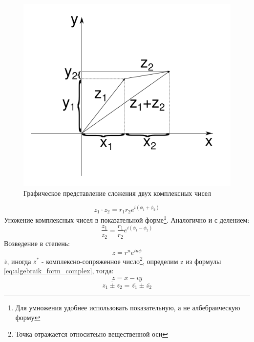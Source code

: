 \documentclass{article}
\begin{document}
            \begin{figure}[h]
                \includegraphics[width=0.8\linewidth]{adding_example}
                \caption{Графическое представление сложения двух комплексных чисел}
                \label{ris:adding_example}
            \end{figure}
            \begin{equation}
               z_{1} \cdot z_{2}=r_{1} r_{2} e^{i (\phi_{1} + \phi_{2})}              
            \end{equation}
            Уножение комплексных чисел в показательной форме\footnote{Для умножения удобнее использовать показательную, а не албебраическую форму}. Аналогично и с делением:
            \begin{equation}
               \frac{z_{1}}{z_{2}}=\frac{r_{1}}{r_{2}} e^{i (\phi_{1} - \phi_{2})}              
            \end{equation}
          Возведение в степень:
            \begin{equation}
               z=r^{n} e^{i n \phi}              
            \end{equation}
            $ \overline{z} $, иногда $z^{*}$ - комплексно-сопряженное число\footnote{Точка отражается относитеьно вещественной оси}, определим z из формулы \ref{eq:algebraik_form_complex}, тогда:
            \begin{equation}\label{complex_conjugate}
               \overline{z}=x-i y              
            \end{equation}
            \begin{equation}\label{complex_conjugate}
               \overline{z_{1} \pm z_{2}}=\overline{z_{1}} \pm \overline{z_{2}}              
            \end{equation}
\end{document}
